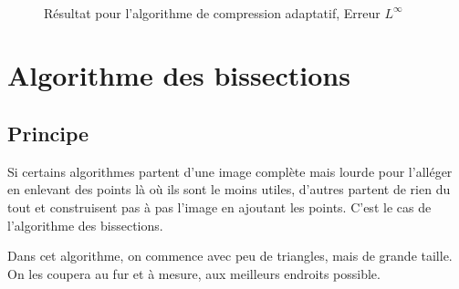 \documentclass{report}
\begin{document}
\begin{figure}[ht!]
\begin{center}
{        }\\ %
    \end{center}
    \caption{%
        Résultat pour l'algorithme de compression adaptatif, Erreur $L^\infty$
    }%
   \label{fig:subfigures}
\end{figure}

\clearpage

\section{Algorithme des bissections}

\subsection{Principe}

Si certains algorithmes partent d'une image complète mais lourde pour l'alléger en enlevant des points là où ils sont le moins utiles, d'autres partent de rien du tout et construisent pas à pas l'image en ajoutant les points. C'est le cas de l'algorithme des bissections.

Dans cet algorithme, on commence avec peu de triangles, mais de grande taille. On les coupera au fur et à mesure, aux meilleurs endroits possible.
\end{document}
